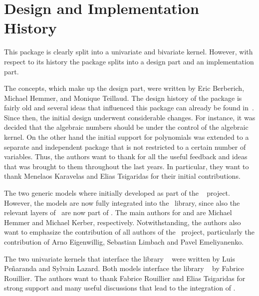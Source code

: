 

\section{Design and Implementation History}

This package is clearly split into a univariate and bivariate
kernel. However, with respect to its history the package splits into
a design part and an implementation part. 

The concepts, which make up the design part, 
were written by Eric Berberich, Michael Hemmer, and
Monique Teillaud. 
The design history of the package is fairly old and several
ideas that influenced this package can already be found
in~\cite{cgal:bhkt-risak-07}. Since then, the initial design underwent
considerable changes. For instance, it was decided that the algebraic
numbers should be under the control of the algebraic kernel. On the other
hand the initial support for polynomials was extended to a separate
and independent package that is not restricted to a certain number of
variables. Thus, the authors want to thank for all the useful feedback and
ideas that was brought to them throughout the last years. In particular,
they want to thank Menelaos Karavelas and Elias Tsigaridas for their
initial contributions.

The two generic models %
where initially developed as part of the \exacus~\cite{beh+-eeeafcs-05} project. 
However, the models are now fully integrated into the \cgal~library, 
since also the relevant layers of \exacus\ are now part of \cgal.
The main authors for  and  are 
Michael Hemmer and Michael Kerber, respectively. Notwithstanding, the authors also want to emphasize the 
contribution of all authors of the \exacus\ project, 
particularly the contribution of Arno Eigenwillig, Sebastian Limbach and Pavel Emeliyanenko. 

The two univariate kernels that interface the library \rs~\cite{cgal:r-rs} were 
written by Luis Pe\~{n}aranda and Sylvain Lazard. 
Both models interface the library \rs~\cite{cgal:r-rs} by Fabrice Rouillier. 
The authors want to thank Fabrice Rouillier and Elias Tsigaridas for 
strong support and many useful discussions that lead to the integration of \rs.


